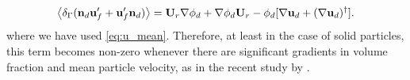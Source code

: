 \begin{equation}
    \avg{\delta_\Gamma (\textbf{n}_d \textbf{u}_f'+  \textbf{u}_f' \textbf{n}_d)} = 
    \textbf{U}_r\grad \phi_d + \grad \phi_d \textbf{U}_r   
-  \phi_d [\grad \textbf{u}_d+ (\grad \textbf{u}_d)^\dagger ]. 
\label{eq:closure_un_nu}
\end{equation} 
where we have used \ref{eq:u_mean}.
Therefore, at least in the case of solid particles, this term becomes non-zero whenever there are significant gradients in volume fraction and mean particle velocity, as in the recent study by \citet{wang2024effect}.
